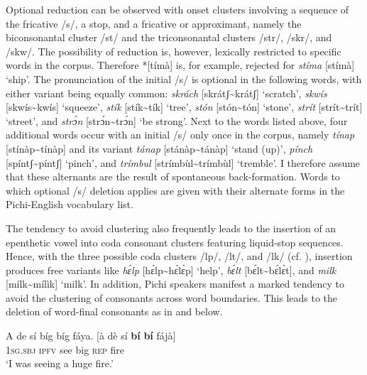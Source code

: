 Optional reduction can be observed with onset clusters involving a sequence of the fricative /s/, a stop, and a fricative or approximant, namely the biconsonantal cluster /st/ and the triconsonantal clusters /str/, /skr/, and /skw/. The possibility of reduction is, however, lexically restricted to specific words in the corpus. Therefore *[tímà] is, for example, rejected for \textit{stíma} [stímà] ‘ship’. The pronunciation of the initial /s/ is optional in the following words, with either variant being equally common: \textit{skrách} [skrátʃ{\textasciitilde}krátʃ] ‘scratch’,\textit{ skwís} [skwís{\textasciitilde}kwís] ‘squeeze’, \textit{stík} [stík{\textasciitilde}tík] ‘tree’, \textit{stón} [stón{\textasciitilde}tón] ‘stone’, \textit{strít} [strít{\textasciitilde}trít] ‘street’, and \textit{strɔ́n} [strɔ́n{\textasciitilde}trɔ́n] ‘be strong’. Next to the words listed above, four additional words occur with an initial /s/ only once in the corpus, namely \textit{tínap} [stínàp{\textasciitilde}tínàp] and its variant \textit{tánap} [stánàp{\textasciitilde}tánàp] ‘stand (up)’, \textit{pínch} [spíntʃ{\textasciitilde}píntʃ] ‘pinch’, and \textit{trímbul} [strímbùl{\textasciitilde}trímbùl] ‘tremble’. I therefore assume that these alternants are the result of spontaneous back-formation. Words to which optional /s/ deletion applies are given with their alternate forms in the Pichi-English vocabulary list.



The tendency to avoid clustering also frequently leads to the insertion of an epenthetic vowel into coda consonant clusters featuring liquid-stop sequences. Hence, with the three possible coda clusters /lp/, /lt/, and /lk/ (cf. ), insertion produces free variants like \textit{hɛ́lp} [hɛ́lp{\textasciitilde}hɛ́lɛ̀p] ‘help’, \textit{bɛ́lt} [bɛ́lt{\textasciitilde}bɛ́lɛ̀t], and \textit{milk} [mílk{\textasciitilde}mílìk] ‘milk’. In addition, Pichi speakers manifest a marked tendency to avoid the clustering of consonants across word boundaries. This leads to the deletion of word-final consonants as in  and  below. 



\ea%
    \label{ex:key:39}
    \gll   A    de  sí    bíg  bíg  fáya.      [à  dè  sí  \textbf{bí}  \textbf{bí}  fájà]\\
\textsc{1sg.sbj}  \textsc{ipfv}  see    big  \textsc{rep}  fire\\

\glt ‘I was seeing a huge fire.’\index{}
\z


